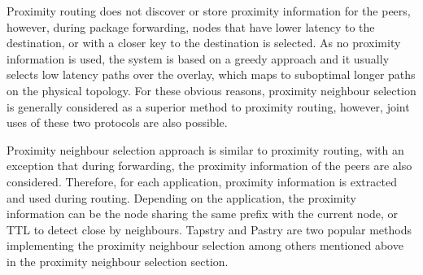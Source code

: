 \documentclass[acmcsur,acmnow]{acmtrans2m}
\begin{document}
Proximity routing does not discover or store proximity information for the
peers, however, during package forwarding, nodes that have lower latency to the
destination, or with a closer key to the destination is selected. As no
proximity information is used, the system is based on a greedy approach and it
usually selects low latency paths over the overlay, which maps to suboptimal
longer paths on the physical topology. For these obvious reasons, proximity
neighbour selection is generally considered as a superior method to proximity
routing, however, joint uses of these two protocols are also possible.

Proximity neighbour selection approach is similar to proximity routing, with an
exception that during forwarding, the proximity information of the peers are
also considered. Therefore, for each application, proximity information is
extracted and used during routing. Depending on the application, the proximity
information can be the node sharing the same prefix with the current node, or
TTL to detect close by neighbours. Tapstry and Pastry are two popular methods
implementing the proximity neighbour selection among others mentioned above in the
proximity neighbour selection section.
\end{document}
